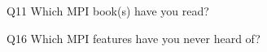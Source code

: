 \begin{description}%
\item{Q11} Which MPI book(s) have you read?%
\item{Q16} Which MPI features have you never heard of?%
\end{description}%
